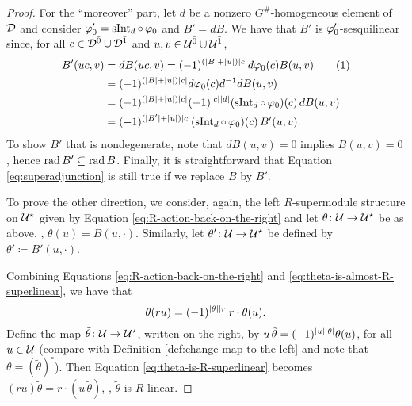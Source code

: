\begin{proof}
	For the ``moreover'' part, let $d$ be a nonzero $G^\#$-homogeneous element of $\mathcal{D}$ and consider $\varphi_0' = \operatorname{sInt}_d \circ \, \varphi_0$ and $B' = dB$.
	We have that $B'$ is $\varphi_0'$-sesquilinear since, for all $c\in \mathcal{D}^{\bar0} \cup \mathcal{D}^{\bar1}$ and $u,v \in \mathcal U^{\bar0} \cup \mathcal U^{\bar1}$,
	\begin{align*}
		B' (uc, v) & = dB (uc, v) = (-1)^{(|B| + |u| ) |c|} d\vphi_0(c) B(u,v) \addtocounter{equation}{1}\tag{\theequation}\label{eq:dB-is-sesquilinear} \\
		           & = (-1)^{(|B| + |u| ) |c|} d\vphi_0(c) d\inv d B(u,v)                                                                                \\
		           & =  (-1)^{(|B| + |u| ) |c|} \sign{c}{d} (\operatorname{sInt}_d \circ\, \vphi_0) (c)\, dB(u,v)                                        \\
		           & = (-1)^{(|B'| + |u|) |c|} (\operatorname{sInt}_d \circ\, \vphi_0) (c)\, B'(u,v).
	\end{align*}
	To show $B'$ that is nondegenerate, note that $dB(u,v) = 0$ implies $B(u,v) =0$, hence  $\operatorname{rad} B' \subseteq \operatorname{rad} B$.
	Finally, it is straightforward that Equation \eqref{eq:superadjunction} is still true if we replace $B$ by $B'$.


	To prove the other direction, we consider, again, the left $R$-supermodule structure on $\mathcal U^\star$ given by Equation \eqref{eq:R-action-back-on-the-right} and let $\theta\colon \mathcal U \to \mathcal U^\star$ be as above, \ie, $\theta(u) = B(u, \cdot)$. Similarly, let $\theta'\colon \mathcal U \to \mathcal U^\star$ be defined by $\theta' \coloneqq B'(u, \cdot)$.

	Combining Equations \eqref{eq:R-action-back-on-the-right} and  \eqref{eq:theta-is-almost-R-superlinear}, we have that
	\begin{equation}\label{eq:theta-is-R-superlinear}
		\theta(ru) = (-1)^{|\theta||r|} r\cdot \theta(u).
	\end{equation}
	Define the map $\tilde \theta\colon \mathcal U \to \mathcal U^\star$, written on the right, by $u\, \tilde\theta = (-1)^{|u||\theta|} \theta(u)$, for all $u\in \mathcal U$ (compare with Definition \ref{def:change-map-to-the-left} and note that $\theta = (\tilde \theta)^\circ$).
	Then Equation \eqref{eq:theta-is-R-superlinear} becomes $(ru)\tilde\theta = r \cdot (u\,\tilde\theta)$, \ie, $\tilde\theta$ is $R$-linear.


\end{proof}
